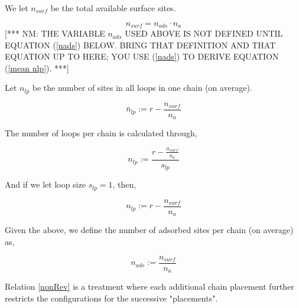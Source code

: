 \documentclass[10pt,letterpaper]{article}
\begin{document}
\noindent We let $n_{surf}$ be the total available surface sites.

\begin{equation}
	\boxed{n_{surf}=n_{ads}\cdotp n_{a}}
	\label{nsurf}
\end{equation}
[***  NM:  THE VARIABLE $n_{ads}$ USED ABOVE IS NOT 
DEFINED UNTIL EQUATION (\ref{nads}) BELOW.  BRING
THAT DEFINITION AND THAT EQUATION UP TO HERE;
YOU USE (\ref{nads}) TO DERIVE EQUATION (\ref{mean nlp}). ***]


\noindent Let $n_{lp}$ be the number of sites in all loops 
in one chain (on average).

\begin{equation}
	\boxed{\bar{n}_{lp}:=r-\frac{n_{surf}}{n_a}}
	\label{mean nlp}
\end{equation}


\noindent The number of loops per 
chain is calculated through,


\begin{equation}
	\boxed{n_{lp}:= \frac{r-\frac{n_{surf}}{n_a}}{s_{lp}}}
	\label{nlp,Gen}
\end{equation}


\noindent And if we let loop size $s_{lp}=1$, then,


\begin{equation}
\boxed{n_{lp}:= r-\frac{n_{surf}}{n_a}}
\label{nlp}
\end{equation}

%






\noindent Given the above, we define the number of adsorbed sites per chain (on average) as,

\begin{equation}
	\boxed{n_{ads}:= \frac{n_{surf}}{n_a}}
	\label{nads}
\end{equation}






\noindent Relation \ref{nonRev} is a treatment %
where each additional chain placement further restricts the configurations for the successive "placements". 
\end{document}

